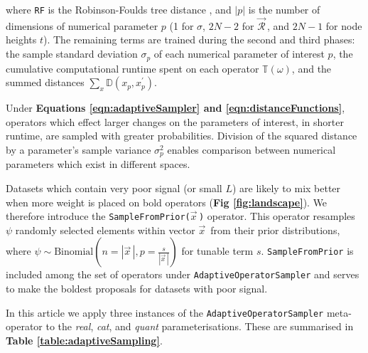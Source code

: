 \documentclass[10pt,letterpaper]{article}
\begin{document}
\noindent
where \texttt{RF} is the Robinson-Foulds tree distance \cite{robinson1981comparison}, and $|p|$ is the number of dimensions of numerical parameter $p$ (1 for $\sigma$, $2N-2$ for $\vec{\mathcal{R}}^{\,}$, and $2N-1$ for node heights $t$).
The remaining terms are trained during the second and third phases: 
the sample standard deviation $\sigma_p$ of each numerical parameter of interest $p$,
the cumulative computational runtime spent on each operator $\mathbb{T}(\omega)$,  and the summed distances $\sum_x \mathbb{D}(x_p, x_p^\prime)$.








Under \textbf{Equations \ref{eqn:adaptiveSampler} and \ref{eqn:distanceFunctions}}, operators which effect larger changes on the parameters of interest, in shorter runtime, are sampled with greater probabilities. 
Division of the squared distance by a parameter's sample variance $\sigma^2_p$ enables comparison between numerical parameters which exist in different spaces.


Datasets which contain very poor signal (or small $L$) are likely to mix better when more weight is placed on bold operators (\textbf{Fig \ref{fig:landscape}}). 
We therefore introduce the \texttt{SampleFromPrior($\vec{x}^{\,}$)} operator.
This operator resamples $\psi$ randomly selected elements within vector $\vec{x}^{\,}$ from their prior distributions, where $\psi \sim \text{Binomial}(n=|\vec{x}^{\,}|, p=\frac{s}{|\vec{x}^{\,}|})$ for tunable term $s$.
\texttt{SampleFromPrior} is included among the set of operators under \texttt{AdaptiveOperatorSampler} and serves to make the boldest proposals for datasets with poor signal.
 






In this article we apply three instances of the \texttt{AdaptiveOperatorSampler} meta-operator to the \textit{real}, \textit{cat}, and \textit{quant} parameterisations. 
These are summarised in \textbf{Table \ref{table:adaptiveSampling}}.
\end{document}
